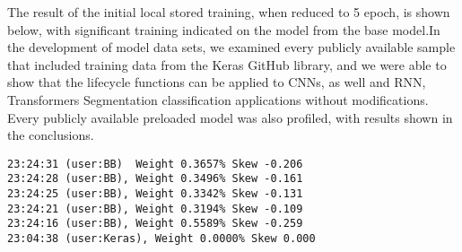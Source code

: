The result of the initial local stored training, when reduced to 5 epoch, is shown below, with significant training indicated on the model from the base model.In the development of model data sets, we examined every publicly available sample that included training data from the Keras GitHub library, and we were able to show that the lifecycle functions can be applied to CNNs, as well and RNN, Transformers Segmentation classification applications without modifications. Every publicly available preloaded model was also profiled, with results shown in the conclusions.

\begin{lstlisting}
23:24:31 (user:BB)  Weight 0.3657% Skew -0.206
23:24:28 (user:BB), Weight 0.3496% Skew -0.161
23:24:25 (user:BB), Weight 0.3342% Skew -0.131
23:24:21 (user:BB), Weight 0.3194% Skew -0.109
23:24:16 (user:BB), Weight 0.5589% Skew -0.259
23:04:38 (user:Keras), Weight 0.0000% Skew 0.000
\end{lstlisting}
